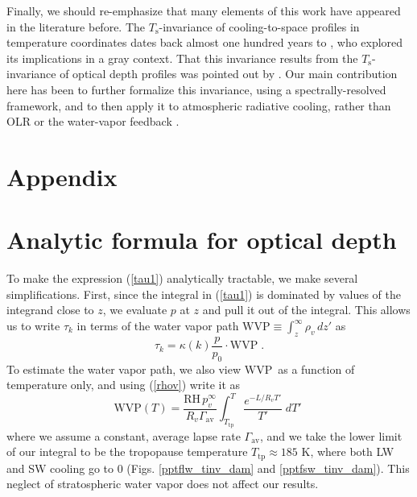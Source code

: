 \documentclass[10pt]{article}
\newcommand{\beqn}{\begin{equation}}
\newcommand{\eeqn}{\end{equation}}
\newcommand{\eqnref}[1]{(\ref{#1})}
\newcommand{\Ts}{\ensuremath{T_\mathrm{s}}}
\newcommand{\RH}{\ensuremath{\mathrm{RH}}}
\newcommand{\WVP}{\ensuremath{\mathrm{WVP}}}
\newcommand{\Ttp}{\ensuremath{T_\mathrm{tp}}}
\newcommand{\gammaav}{\ensuremath{\Gamma_\mathrm{av}}}
\begin{document}
Finally, we should re-emphasize that many elements of this work have appeared in the literature before. The \Ts-invariance of cooling-to-space profiles in temperature coordinates dates back almost one hundred years to \cite{simpson1928}, who explored its implications in a gray context. That this invariance results from the \Ts-invariance of optical depth profiles was pointed out by \cite{ingram2010}. Our main contribution here has been to further formalize this invariance, using a spectrally-resolved framework, and to then apply it to atmospheric radiative cooling, rather than OLR \citep{simpson1928} or the water-vapor feedback \citep{ingram2010}. 



\section*{Appendix}



\appendix
	

	\section{Analytic formula for optical depth}	 \label{appendix_tau_formula}	
To make the expression   \eqnref{tau1}  analytically tractable, we make several simplifications.  First, since the integral in \eqnref{tau1} is dominated by values of the integrand close to $z$, we evaluate $p$  at $z$ and pull it out of the integral. This allows us to write $\tau_k$ in terms of the water vapor path $\WVP\equiv \int_z^\infty  \rho_v\, dz'$ as
	\beqn
		\tau_k =  \kappa(k) \frac{p}{p_0} \cdot \WVP \; .
	\label{tauWVP}
	\eeqn
To estimate the water vapor path, we also view \WVP\ as a function of temperature only, and using \eqnref{rhov} write it as 
	\beqn
		\WVP(T) =\frac{ \RH\, p_v^\infty}{R_v \gammaav}\int^T_{\Ttp} \frac{e^{-L/R_v T'}}{T'}\; dT' \; 
	\label{WVP1}
	\eeqn	
where we assume a constant, average lapse rate $\gammaav$, and we take the lower limit of our integral to be the tropopause temperature $\Ttp\approx 185$ K, where both LW and SW cooling go to 0 (Figs. \ref{pptflw_tinv_dam} and \ref{pptfsw_tinv_dam}). This neglect of stratospheric water vapor does not affect our results. 
\end{document}
